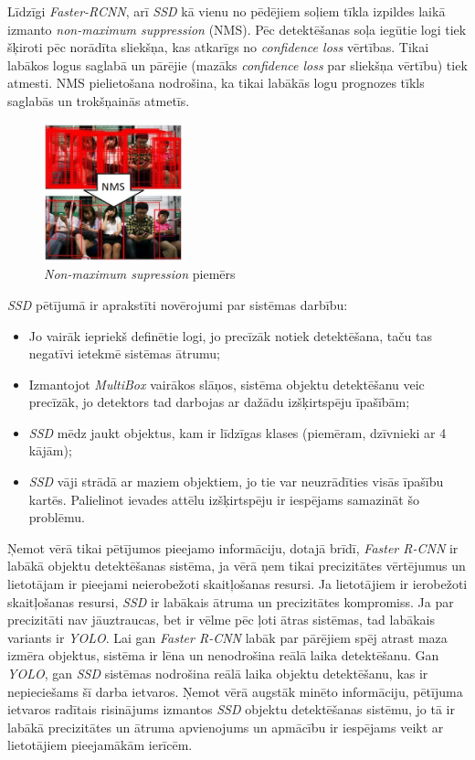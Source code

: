 Līdzīgi \textit{Faster-RCNN}, arī \textit{SSD} kā vienu no pēdējiem soļiem tīkla izpildes laikā izmanto \textit{non-maximum suppression} (NMS). Pēc detektēšanas soļa iegūtie logi tiek šķiroti pēc norādīta sliekšņa, kas atkarīgs no \textit{confidence loss} vērtības. Tikai labākos logus saglabā un pārējie (mazāks \textit{confidence loss} par sliekšņa vērtību) tiek atmesti. NMS pielietošana nodrošina, ka tikai labākās logu prognozes tīkls saglabās un trokšņainās atmetīs.
 \newpage
\begin{figure}[h]%
	\centering
	\includegraphics[height=4cm]{images/nms.png} %
	\caption{\textit{Non-maximum supression} piemērs \cite{liu2016ssd}}%
	\label{fig:example}%
\end{figure}

\textit{SSD} pētījumā \cite{liu2016ssd} ir aprakstīti novērojumi par sistēmas darbību:
\begin{itemize}
	\item Jo vairāk iepriekš definētie logi, jo precīzāk notiek detektēšana, taču tas negatīvi ietekmē sistēmas ātrumu;
	\item Izmantojot \textit{MultiBox} vairākos slāņos, sistēma objektu detektēšanu veic precīzāk, jo detektors tad darbojas ar dažādu izšķirtspēju īpašībām;
	\item \textit{SSD} mēdz jaukt objektus, kam ir līdzīgas klases (piemēram, dzīvnieki ar 4 kājām);
	\item \textit{SSD} vāji strādā ar maziem objektiem, jo tie var neuzrādīties visās īpašību kartēs. Palielinot ievades attēlu izšķirtspēju ir iespējams samazināt šo problēmu.
\end{itemize}

Ņemot vērā tikai pētījumos \cite{redmon2016you,ren2015faster,liu2016ssd} pieejamo informāciju, dotajā brīdī, \textit{Faster R-CNN} ir labākā objektu detektēšanas sistēma, ja vērā ņem tikai precizitātes vērtējumus un lietotājam ir pieejami neierobežoti skaitļošanas resursi. Ja lietotājiem ir ierobežoti skaitļošanas resursi, \textit{SSD} ir labākais ātruma un precizitātes kompromiss. Ja par precizitāti nav jāuztraucas, bet ir vēlme pēc ļoti ātras sistēmas, tad labākais variants ir \textit{YOLO}. Lai gan \textit{Faster R-CNN} labāk par pārējiem spēj atrast maza izmēra objektus, sistēma ir lēna un nenodrošina reālā laika detektēšanu. Gan \textit{YOLO}, gan \textit{SSD} sistēmas nodrošina reālā laika objektu detektēšanu, kas ir nepieciešams šī darba ietvaros. Ņemot vērā augstāk minēto informāciju, pētījuma ietvaros radītais risinājums izmantos \textit{SSD} objektu detektēšanas sistēmu, jo tā ir labākā precizitātes un ātruma apvienojums un apmācību ir iespējams veikt ar lietotājiem pieejamākām ierīcēm. 

